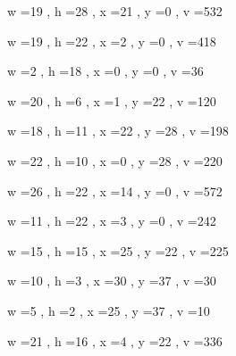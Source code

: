\documentclass[11pt]{article}
\begin{document}
w =19 , h =28 , x =21 , y =0 , v =532
\par
w =19 , h =22 , x =2 , y =0 , v =418
\par
w =2 , h =18 , x =0 , y =0 , v =36
\par
w =20 , h =6 , x =1 , y =22 , v =120
\par
w =18 , h =11 , x =22 , y =28 , v =198
\par
w =22 , h =10 , x =0 , y =28 , v =220
\par
\newpage




w =26 , h =22 , x =14 , y =0 , v =572
\par
w =11 , h =22 , x =3 , y =0 , v =242
\par
w =15 , h =15 , x =25 , y =22 , v =225
\par
w =10 , h =3 , x =30 , y =37 , v =30
\par
w =5 , h =2 , x =25 , y =37 , v =10
\par
w =21 , h =16 , x =4 , y =22 , v =336
\par
\newpage
\end{document}
